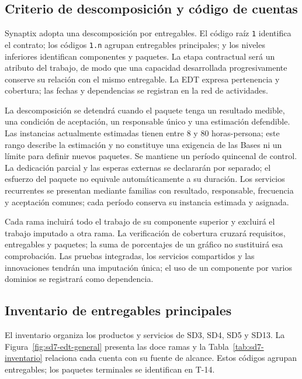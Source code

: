 \subsection{Criterio de descomposición y código de cuentas}
Synaptix adopta una descomposición por entregables. El código raíz \texttt{1} identifica el contrato; los códigos \texttt{1.n} agrupan entregables principales; y los niveles inferiores identifican componentes y paquetes. La etapa contractual será un atributo del trabajo, de modo que una capacidad desarrollada progresivamente conserve su relación con el mismo entregable. La EDT expresa pertenencia y cobertura; las fechas y dependencias se registran en la red de actividades.

La descomposición se detendrá cuando el paquete tenga un resultado medible, una condición de aceptación, un responsable único y una estimación defendible. Las instancias actualmente estimadas tienen entre 8 y 80 horas-persona; este rango describe la estimación y no constituye una exigencia de las Bases ni un límite para definir nuevos paquetes. Se mantiene un período quincenal de control. La dedicación parcial y las esperas externas se declararán por separado; el esfuerzo del paquete no equivale automáticamente a su duración. Los servicios recurrentes se presentan mediante familias con resultado, responsable, frecuencia y aceptación comunes; cada período conserva su instancia estimada y asignada.

Cada rama incluirá todo el trabajo de su componente superior y excluirá el trabajo imputado a otra rama. La verificación de cobertura cruzará requisitos, entregables y paquetes; la suma de porcentajes de un gráfico no sustituirá esa comprobación. Las pruebas integradas, los servicios compartidos y las innovaciones tendrán una imputación única; el uso de un componente por varios dominios se registrará como dependencia.

\subsection{Inventario de entregables principales}
El inventario organiza los productos y servicios de SD3, SD4, SD5 y SD13. La Figura~\ref{fig:sd7-edt-general} presenta las doce ramas y la Tabla~\ref{tab:sd7-inventario} relaciona cada cuenta con su fuente de alcance. Estos códigos agrupan entregables; los paquetes terminales se identifican en T-14.


